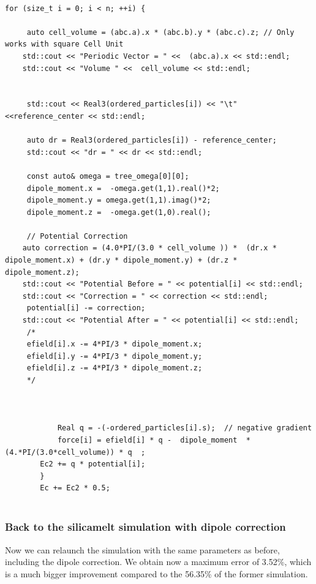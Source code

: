 \documentclass[12pt,twoside,a4paper]{report}
\begin{document}
	\begin{lstlisting}

for (size_t i = 0; i < n; ++i) {

	 auto cell_volume = (abc.a).x * (abc.b).y * (abc.c).z; // Only works with square Cell Unit
	std::cout << "Periodic Vector = " <<  (abc.a).x << std::endl;
	std::cout << "Volume " <<  cell_volume << std::endl;


	 std::cout << Real3(ordered_particles[i]) << "\t" <<reference_center << std::endl;

	 auto dr = Real3(ordered_particles[i]) - reference_center;
	 std::cout << "dr = " << dr << std::endl;

	 const auto& omega = tree_omega[0][0];
     dipole_moment.x =  -omega.get(1,1).real()*2;
	 dipole_moment.y = omega.get(1,1).imag()*2;
	 dipole_moment.z =  -omega.get(1,0).real();

	 // Potential Correction
	auto correction = (4.0*PI/(3.0 * cell_volume )) *  (dr.x * dipole_moment.x) + (dr.y * dipole_moment.y) + (dr.z * dipole_moment.z);
	std::cout << "Potential Before = " << potential[i] << std::endl;
	std::cout << "Correction = " << correction << std::endl;
	 potential[i] -= correction;
	std::cout << "Potential After = " << potential[i] << std::endl;
	 /*
	 efield[i].x -= 4*PI/3 * dipole_moment.x;
	 efield[i].y -= 4*PI/3 * dipole_moment.y;
	 efield[i].z -= 4*PI/3 * dipole_moment.z;
	 */



            Real q = -(-ordered_particles[i].s);  // negative gradient
            force[i] = efield[i] * q -  dipole_moment  * (4.*PI/(3.0*cell_volume)) * q  ;
	    Ec2 += q * potential[i];
        }
        Ec += Ec2 * 0.5;


\end{lstlisting}
	
\subsubsection{Back to the silicamelt simulation with dipole correction}

Now we can relaunch the simulation with the same parameters as before, including the dipole correction.
We obtain now a maximum error of 3.52\%, which is a much bigger improvement compared to the 56.35\% of the former simulation.
\end{document}
